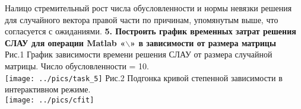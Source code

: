 Налицо стремительный рост числа обусловленности и нормы невязки решения для случайного вектора правой части по причинам, упомянутым выше, что согласуется с ожиданиями.
\newpage
{\Large{\textbf{5. Построить график временных затрат решения СЛАУ для операции Matlab «$\backslash$» в зависимости от размера матрицы}}}\\
Рис.1 График зависимости времени решения СЛАУ от размера случайной матрицы. Число обусловленности = 10.\\
\texttt{[image: ../pics/task\_5]}
Рис.2 Подгонка кривой степенной зависимости в интерактивном режиме.\\
\texttt{[image: ../pics/cfit]}









